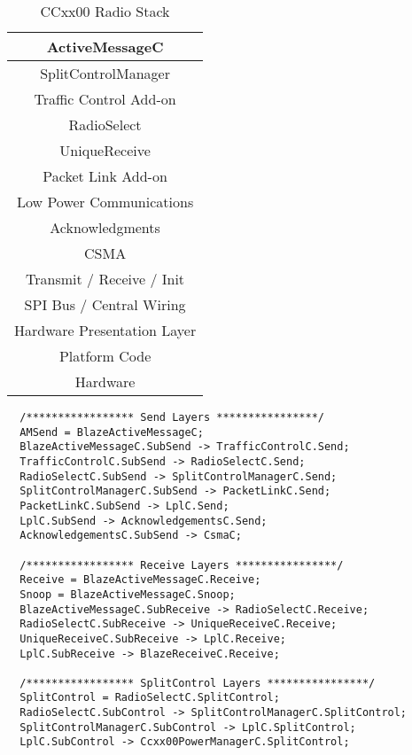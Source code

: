 \documentclass{article}
\begin{document}
\begin{table}
	\centering
		\begin{tabular}{|c|}
		  \hline
      ActiveMessageC \\ \hline \hline
      SplitControlManager \\ \hline
      Traffic Control Add-on \\ \hline
      RadioSelect \\ \hline
      UniqueReceive \\ \hline
      Packet Link Add-on \\ \hline
      Low Power Communications \\ \hline
      Acknowledgments \\ \hline
      CSMA \\ \hline \hline
      Transmit / Receive / Init \\ \hline
      SPI Bus / Central Wiring \\ \hline
      \hline
      Hardware Presentation Layer \\ \hline
      Platform Code \\ \hline
      \hline
      Hardware \\
      \hline
      
   	\end{tabular}
	\caption{CCxx00 Radio Stack}
	\label{tab:CCxx00RadioStack}
\end{table}


\begin{verbatim}  
  /***************** Send Layers ****************/
  AMSend = BlazeActiveMessageC;
  BlazeActiveMessageC.SubSend -> TrafficControlC.Send;
  TrafficControlC.SubSend -> RadioSelectC.Send;
  RadioSelectC.SubSend -> SplitControlManagerC.Send;
  SplitControlManagerC.SubSend -> PacketLinkC.Send;
  PacketLinkC.SubSend -> LplC.Send;
  LplC.SubSend -> AcknowledgementsC.Send;
  AcknowledgementsC.SubSend -> CsmaC;
  
  /***************** Receive Layers ****************/
  Receive = BlazeActiveMessageC.Receive;
  Snoop = BlazeActiveMessageC.Snoop;
  BlazeActiveMessageC.SubReceive -> RadioSelectC.Receive;
  RadioSelectC.SubReceive -> UniqueReceiveC.Receive;
  UniqueReceiveC.SubReceive -> LplC.Receive;
  LplC.SubReceive -> BlazeReceiveC.Receive;
    
  /***************** SplitControl Layers ****************/
  SplitControl = RadioSelectC.SplitControl;
  RadioSelectC.SubControl -> SplitControlManagerC.SplitControl;
  SplitControlManagerC.SubControl -> LplC.SplitControl;
  LplC.SubControl -> Ccxx00PowerManagerC.SplitControl;
\end{verbatim}
\end{document}
